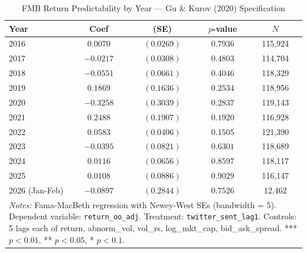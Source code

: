\begin{table}[htbp]
\centering
\caption{FMB Return Predictability by Year --- Gu \& Kurov (2020) Specification}
\label{tab:gk_fmb_annual}
\begin{tabular}{lcccc}
\hline\hline
Year & Coef & (SE) & $p$-value & $N$ \\
\hline
  2016 & $0.0070$ & $(0.0269)$ & $0.7936$ & 115,924 \\
  2017 & $-0.0217$ & $(0.0308)$ & $0.4803$ & 114,704 \\
  2018 & $-0.0551$ & $(0.0661)$ & $0.4046$ & 118,329 \\
  2019 & $0.1869$ & $(0.1636)$ & $0.2534$ & 118,956 \\
  2020 & $-0.3258$ & $(0.3039)$ & $0.2837$ & 119,143 \\
  2021 & $0.2488$ & $(0.1907)$ & $0.1920$ & 116,928 \\
  2022 & $0.0583$ & $(0.0406)$ & $0.1505$ & 121,390 \\
  2023 & $-0.0395$ & $(0.0821)$ & $0.6301$ & 118,689 \\
  2024 & $0.0116$ & $(0.0656)$ & $0.8597$ & 118,117 \\
  2025 & $0.0108$ & $(0.0886)$ & $0.9029$ & 116,147 \\
  2026 (Jan-Feb) & $-0.0897$ & $(0.2844)$ & $0.7526$ & 12,462 \\
\hline\hline
\multicolumn{5}{p{0.9\linewidth}}{\footnotesize \textit{Notes:} Fama-MacBeth regression with Newey-West SEs (bandwidth = 5). Dependent variable: \texttt{return_oo_adj}. Treatment: \texttt{twitter\_sent\_lag1}. Controls: 5 lags each of return, abnorm\_vol, vol\_rs, log\_mkt\_cap, bid\_ask\_spread. *** $p<0.01$, ** $p<0.05$, * $p<0.1$.} \\
\end{tabular}
\end{table}